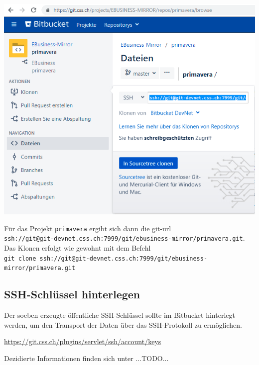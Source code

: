 \documentclass[]{article}
\newcommand{\code}[1]{\texttt{#1}}
\begin{document}
\includegraphics[scale=0.3]{assets/clone.png}

Für das Projekt \code{primavera} ergibt sich dann die git-url \\
\code{ssh://git@git-devnet.css.ch:7999/git/ebusiness-mirror/primavera.git}. Das Klonen erfolgt wie gewohnt mit dem Befehl \\
\code{git clone ssh://git@git-devnet.css.ch:7999/git/ebusiness-mirror/primavera.git}

\subsection{SSH-Schlüssel hinterlegen}
Der soeben erzeugte öffentliche SSH-Schlüssel sollte im Bitbucket hinterlegt werden, um den Transport der Daten über das SSH-Protokoll zu ermöglichen.

\href{https://git.css.ch/plugins/servlet/ssh/account/keys}{https://git.css.ch/plugins/servlet/ssh/account/keys}

Dezidierte Informationen finden sich unter ...TODO...
\end{document}
